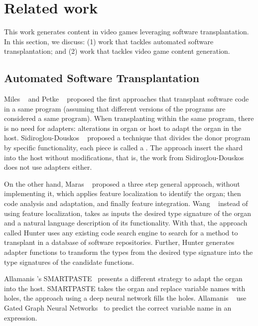 \section{Related work} 
\label{sec:Related}

This work generates content in video games leveraging software transplantation. In this section, we discuss: (1) work that tackles automated software transplantation; and (2) work that tackles video game content generation.

\subsection{Automated Software Transplantation}

Miles \etal~\cite{miles2012situ} and Petke \etal~\cite{petke2014using} proposed the first approaches that transplant software code in a same program (assuming that different versions of the programs are considered a same program). When transplanting within the same program, there is no need for adapters: alterations in organ or host to adapt the organ in the host. Sidiroglou-Douskos \etal~\cite{sidiroglou2015horizontal} proposed a technique that divides the donor program by specific functionality, each piece is called a . The approach insert the shard into the host without modifications, that is, the work from Sidiroglou-Douskos does not use adapters either.

On the other hand, Maras \etal~\cite{maras2015towards} proposed a three step general approach, without implementing it, which applies feature localization to identify the organ; then code analysis and adaptation, and finally feature integration. Wang \etal~\cite{wang2016hunter} instead of using feature localization, takes as inputs the desired type signature of the organ and a natural language description of its functionality. With that, the approach called Hunter uses any existing code search engine to search for a method to transplant in a database of software repositories. Further, Hunter generates adapter functions to transform the types from the desired type signature into the type signatures of the candidate functions.

Allamanis \etal's SMARTPASTE~\cite{allamanis2017smartpaste} presents a different strategy to adapt the organ into the host. SMARTPASTE takes the organ and replace variable names with holes, the approach using a deep neural network fills the holes. Allamanis \etal~\cite{allamanis2017smartpaste} use Gated Graph Neural Networks~\cite{li2015gated} to predict the correct variable name in an expression.

